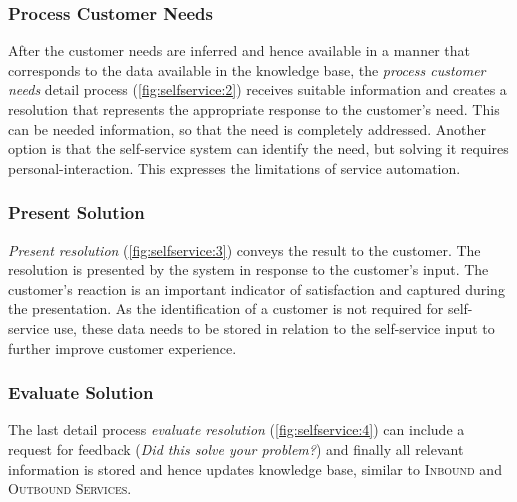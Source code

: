 	 \subsubsection{Process Customer Needs}
	 After the customer needs are inferred and hence available in a manner that corresponds to the data available in the knowledge base, the \textit{process customer needs} detail process (\Fig \ref{fig:selfservice:2}) receives suitable information and creates a resolution that represents the appropriate response to the customer's need. This can be needed information, so that the need is completely addressed. Another option is that the self-service system can identify the need, but solving it requires personal-interaction. This expresses the limitations of service automation. 
	 
	 \subsubsection{Present Solution}
	 \textit{Present resolution} (\Fig \ref{fig:selfservice:3}) conveys the result to the customer. The resolution is presented by the system in response to the customer's input. The customer's reaction is an important indicator of satisfaction and captured during the presentation. As the identification of a customer is not required for self-service use, these data needs to be stored in relation to the self-service input to further improve customer experience. 
	 
	 \subsubsection{Evaluate Solution}
	 The last detail process \textit{evaluate resolution} (\Fig \ref{fig:selfservice:4}) can include a request for feedback (\textit{Did this solve your problem?}) and finally all relevant information is stored and hence updates knowledge base, similar to \textsc{Inbound} and \textsc{Outbound Services}.
	 

